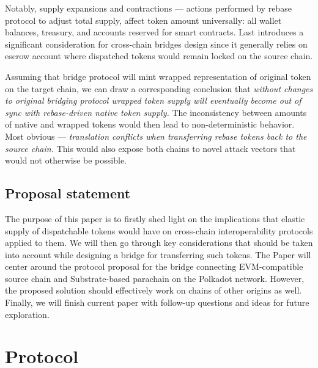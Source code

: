 \documentclass{article}
\begin{document}
Notably, supply expansions and contractions --- actions performed by rebase protocol to adjust total supply, affect token amount universally: all wallet balances, treasury, and accounts reserved for smart contracts. Last introduces a significant consideration for cross-chain bridges design since it generally relies on escrow account where dispatched tokens would remain locked on the source chain.

Assuming that bridge protocol will mint wrapped representation of original token on the target chain, we can draw a corresponding conclusion that \textit{without changes to original bridging protocol wrapped token supply will eventually become out of sync with rebase-driven native token supply.} The inconsistency between amounts of native and wrapped tokens would then lead to non-deterministic behavior. Most obvious --- \textit{translation conflicts when transferring rebase tokens back to the source chain.} This would also expose both chains to novel attack vectors that would not otherwise be possible.

\subsection{Proposal statement}

The purpose of this paper is to firstly shed light on the implications that elastic supply of dispatchable tokens would have on cross-chain interoperability protocols applied to them. We will then go through key considerations that should be taken into account while designing a bridge for transferring such tokens. The Paper will center around the protocol proposal for the bridge connecting EVM-compatible source chain and Substrate-based parachain on the Polkadot network. However, the proposed solution should effectively work on chains of other origins as well. Finally, we will finish current paper with follow-up questions and ideas for future exploration.

\section{Protocol}



\end{document}

